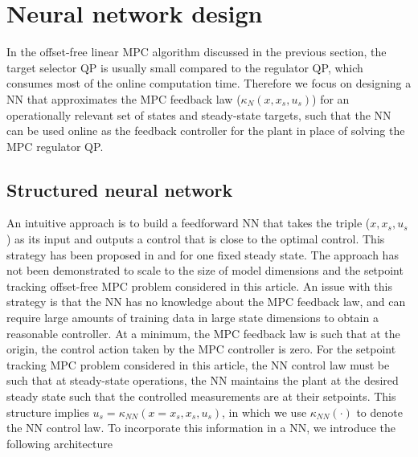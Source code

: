 \documentclass[preprint,5p, twocolumn, authoryear]{elsarticle}
\begin{document}
\section{Neural network design} \label{sec:controller_design}

In the offset-free linear MPC algorithm discussed in the previous 
section, the target selector QP is
usually small compared to the 
regulator QP, which consumes most of the online computation time. 
Therefore we focus on designing a NN that approximates the 
MPC feedback law ($\kappa_N(x, x_s, u_s)$)
for an operationally relevant set of states and steady-state targets, 
such that the NN 
can be used online as the feedback controller 
for the plant in place of solving the MPC regulator QP.

\subsection{Structured neural network}
An intuitive approach is to build a feedforward NN 
that takes the triple ($x, x_s, u_s$) as its input 
and outputs a control that is close to the optimal control. 
This strategy has been proposed in \cite*{karg:lucia:2020} and 
\cite*{chen:saulnier:atanasov:lee:kumar:pappas:morari:2018}
for one fixed steady state. The approach has not been 
demonstrated to scale to the size of model dimensions 
and the setpoint tracking 
offset-free MPC problem considered in this article.
An issue with this strategy 
is that the NN has no knowledge about 
the MPC feedback law, and can require large amounts
of training data in large state dimensions 
to obtain a reasonable controller. At a minimum,
the MPC feedback law is such that at the origin, the 
control action taken by the MPC controller is zero. For the 
setpoint tracking MPC problem considered in this article, 
the NN control law must be such that at steady-state 
operations, the NN maintains the plant at the desired steady state
such that the controlled measurements are at their setpoints.
This structure implies $u_s = \kappa_{NN}(x = x_s, x_s, u_s)$, 
in which we use $\kappa_{NN}(\cdot)$ to denote the NN control law.
To incorporate this information in a NN, we introduce the following
architecture
\end{document}

